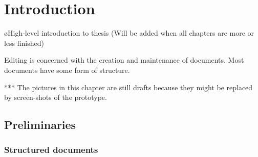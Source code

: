 \chapter{Introduction}
\label{chap:introduction}






%								
%								
%								



\bl
\o High-level introduction to thesis (Will be added when all chapters are more or less finished)
\el

\bc
Editing is concerned with the creation and maintenance of documents.  
Most documents have some form of structure. 
\ec






*** The pictures in this chapter are still drafts because they might be replaced by screen-shots of the prototype.\\

\section{Preliminaries}

\subsection{Structured documents} \label{sect:structdocs}


